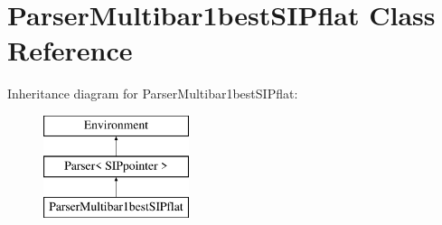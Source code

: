\hypertarget{classParserMultibar1bestSIPflat}{}\section{Parser\+Multibar1best\+S\+I\+Pflat Class Reference}
\label{classParserMultibar1bestSIPflat}
Inheritance diagram for Parser\+Multibar1best\+S\+I\+Pflat\+:\begin{figure}[H]
\begin{center}
\leavevmode
\includegraphics[height=3.000000cm]{classParserMultibar1bestSIPflat}
\end{center}
\end{figure}
